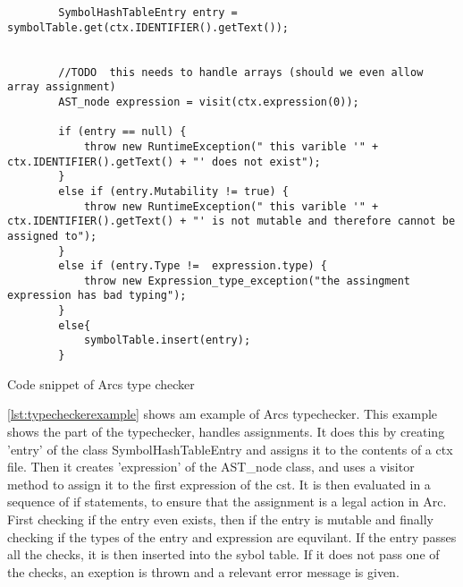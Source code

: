 \begin{listing}[htb!]
    \begin{verbatim}
        SymbolHashTableEntry entry = symbolTable.get(ctx.IDENTIFIER().getText());
        

        //TODO  this needs to handle arrays (should we even allow array assignment)
        AST_node expression = visit(ctx.expression(0));

        if (entry == null) {
            throw new RuntimeException(" this varible '" + ctx.IDENTIFIER().getText() + "' does not exist");
        }
        else if (entry.Mutability != true) {
            throw new RuntimeException(" this varible '" + ctx.IDENTIFIER().getText() + "' is not mutable and therefore cannot be assigned to");
        }
        else if (entry.Type !=  expression.type) {
            throw new Expression_type_exception("the assingment expression has bad typing");
        }
        else{
            symbolTable.insert(entry);
        }
    \end{verbatim}
    \caption{Code snippet of Arcs type checker}
    \label{lst:typecheckerexample}
\end{listing}
\ref{lst:typecheckerexample} shows am example of Arcs typechecker. This example shows the part of the typechecker, handles assignments. It does this by creating 'entry' of the class SymbolHashTableEntry and assigns it to the contents of a ctx file. Then it creates 'expression' of the AST\_node class, and uses a visitor method to assign it to the first expression of the \gls{cst}. It is then evaluated in a sequence of if statements, to ensure that the assignment is a legal action in Arc. First checking if the entry even exists, then if the entry is mutable and finally checking if the types of the entry and expression are equvilant. If the entry passes all the checks, it is then inserted into the sybol table. If it does not pass one of the checks, an exeption is thrown and a relevant error message is given.


